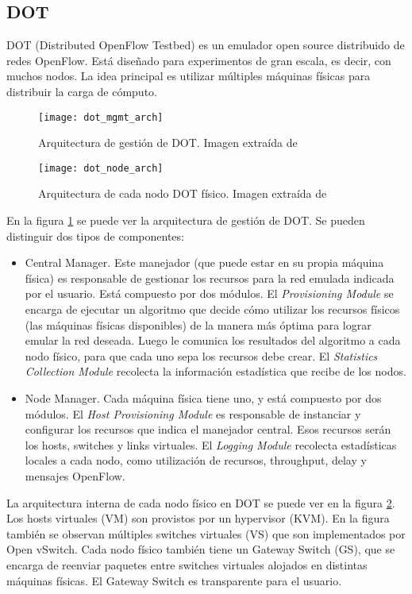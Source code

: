 \subsection{DOT}
DOT (Distributed OpenFlow Testbed) \cite{dot} es un emulador open source distribuido de redes OpenFlow. Está diseñado para experimentos de gran escala, es decir, con muchos nodos. La idea principal es utilizar múltiples máquinas físicas para distribuir la carga de cómputo.

\begin{figure}[t]
	\caption{Arquitectura de gestión de DOT. Imagen extraída de \cite{dot}}
	\texttt{[image: dot\_mgmt\_arch]}
	\centering
	\label{fig:dot_mgmt_arch}
\end{figure}

\begin{figure}[t]
	\caption{Arquitectura de cada nodo DOT físico. Imagen extraída de \cite{dot}}
	\texttt{[image: dot\_node\_arch]}
	\centering
	\label{fig:dot_node_arch}
\end{figure}

En la figura \ref{fig:dot_mgmt_arch} se puede ver la arquitectura de gestión de DOT. Se pueden distinguir dos tipos de componentes:
\begin{itemize}
	\item Central Manager. Este manejador (que puede estar en su propia máquina física) es responsable de gestionar los recursos para la red emulada indicada por el usuario. Está compuesto por dos módulos. El \textit{Provisioning Module} se encarga de ejecutar un algoritmo que decide cómo utilizar los recursos físicos (las máquinas físicas disponibles) de la manera más óptima para lograr emular la red deseada. Luego le comunica los resultados del algoritmo a cada nodo físico, para que cada uno sepa los recursos debe crear. El \textit{Statistics Collection Module} recolecta la información estadística que recibe de los nodos.
	\item Node Manager. Cada máquina física tiene uno, y está compuesto por dos módulos. El \textit{Host Provisioning Module} es responsable de instanciar y configurar los recursos que indica el manejador central. Esos recursos serán los hosts, switches y links virtuales. El \textit{Logging Module} recolecta estadísticas locales a cada nodo, como utilización de recursos, throughput, delay y mensajes OpenFlow.
\end{itemize}

La arquitectura interna de cada nodo físico en DOT se puede ver en la figura \ref{fig:dot_node_arch}. Los hosts virtuales (VM) son provistos por un hypervisor (KVM). En la figura también se observan múltiples switches virtuales (VS) que son implementados por Open vSwitch. Cada nodo físico también tiene un Gateway Switch (GS), que se encarga de reenviar paquetes entre switches virtuales alojados en distintas máquinas físicas. El Gateway Switch es transparente para el usuario.

